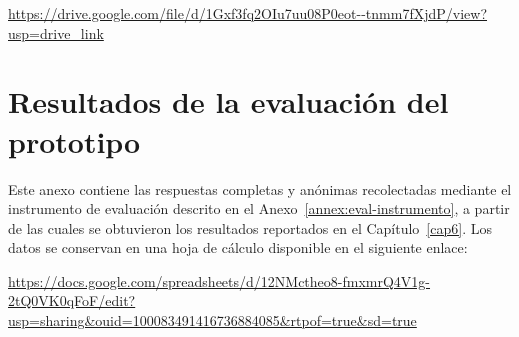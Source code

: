 \noindent\url{https://drive.google.com/file/d/1Gxf3fq2OIu7uu08P0eot--tnmm7fXjdP/view?usp=drive_link}

\chapter{Resultados de la evaluación del prototipo}
\label{annex:eval-datos}

Este anexo contiene las respuestas completas y anónimas recolectadas mediante el instrumento de evaluación descrito en el Anexo~\ref{annex:eval-instrumento}, a partir de las cuales se obtuvieron los resultados reportados en el Capítulo~\ref{cap6}. Los datos se conservan en una hoja de cálculo disponible en el siguiente enlace:

\noindent\url{https://docs.google.com/spreadsheets/d/12NMctheo8-fmxmrQ4V1g-2tQ0VK0qFoF/edit?usp=sharing&ouid=100083491416736884085&rtpof=true&sd=true}
